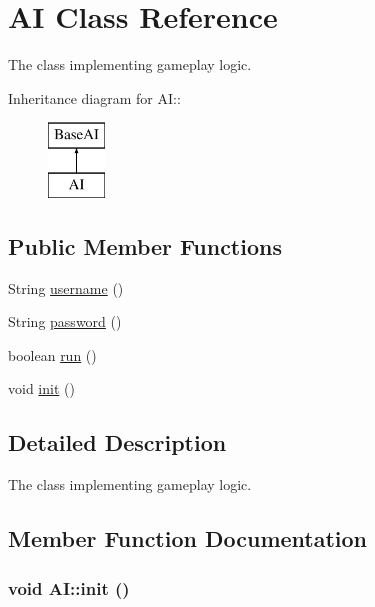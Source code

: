 \hypertarget{classAI}{
\section{AI Class Reference}
\label{classAI}
}
The class implementing gameplay logic.  


Inheritance diagram for AI::\begin{figure}[H]
\begin{center}
\leavevmode
\includegraphics[height=2cm]{classAI}
\end{center}
\end{figure}
\subsection*{Public Member Functions}
\begin{CompactItemize}
\item 
String \hyperlink{classAI_d7e6db6b414a192ad2af8656d012cfdc}{username} ()
\item 
String \hyperlink{classAI_405047fd39e03de993183392a06d655b}{password} ()
\item 
boolean \hyperlink{classAI_f25b3a076daef2aaf9f74ecf458bdfbc}{run} ()
\item 
void \hyperlink{classAI_8c8e3a635791abaa61585357e6a25f63}{init} ()
\end{CompactItemize}


\subsection{Detailed Description}
The class implementing gameplay logic. 

\subsection{Member Function Documentation}
\hypertarget{classAI_8c8e3a635791abaa61585357e6a25f63}{
\subsubsection[{init}]{\setlength{\rightskip}{0pt plus 5cm}void AI::init ()}}
\label{classAI_8c8e3a635791abaa61585357e6a25f63}


